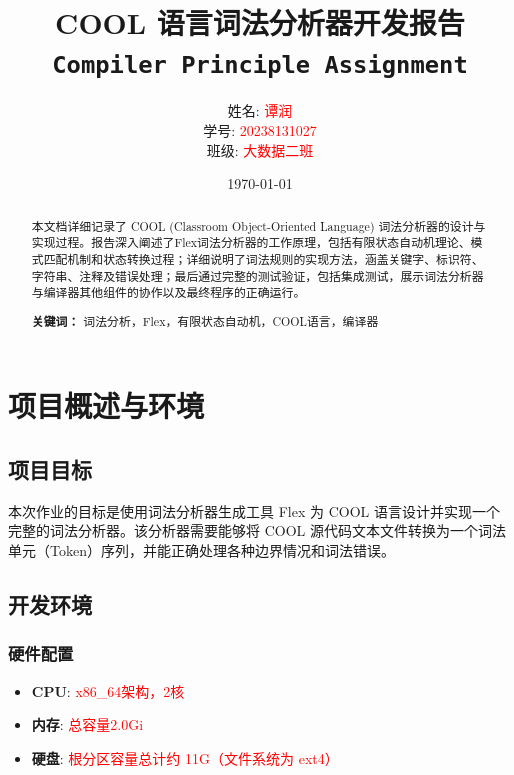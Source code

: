 \documentclass[twocolumn]{article}
\title{
    \vspace{-1cm}
    \textbf{COOL 语言词法分析器开发报告} \\
    \large \texttt{Compiler Principle Assignment}
}
\author{
    姓名: \textcolor{red}{谭润} \\
    学号: \textcolor{red}{20238131027} \\
    班级: \textcolor{red}{大数据二班}
}
\date{\today}
\begin{document}
\maketitle
\thispagestyle{fancy}

\begin{abstract}
\noindent
本文档详细记录了 COOL (Classroom Object-Oriented Language) 词法分析器的设计与实现过程。报告深入阐述了Flex词法分析器的工作原理，包括有限状态自动机理论、模式匹配机制和状态转换过程；详细说明了词法规则的实现方法，涵盖关键字、标识符、字符串、注释及错误处理；最后通过完整的测试验证，包括集成测试，展示词法分析器与编译器其他组件的协作以及最终程序的正确运行。

\textbf{关键词：} 词法分析，Flex，有限状态自动机，COOL语言，编译器
\end{abstract}

\section{项目概述与环境}
\subsection{项目目标}
本次作业的目标是使用词法分析器生成工具 Flex 为 COOL 语言设计并实现一个完整的词法分析器。该分析器需要能够将 COOL 源代码文本文件转换为一个词法单元（Token）序列，并能正确处理各种边界情况和词法错误。

\subsection{开发环境}

\subsubsection{硬件配置}
\begin{itemize}
    \item \textbf{CPU}: \textcolor{red}{x86\_64架构，2核}
    \item \textbf{内存}: \textcolor{red}{总容量2.0Gi}
    \item \textbf{硬盘}: \textcolor{red}{根分区容量总计约 11G（文件系统为 ext4）}
\end{itemize}
\end{document}
